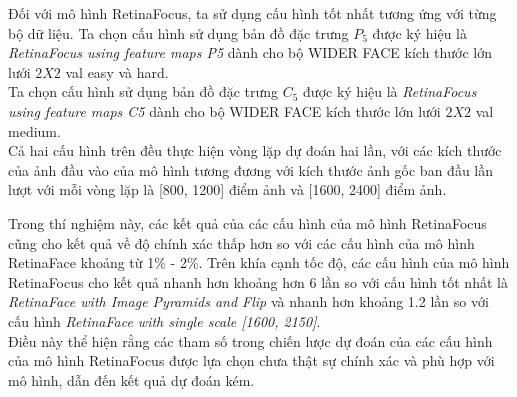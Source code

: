 {    \noindent
    Đối với mô hình RetinaFocus, ta sử dụng cấu hình tốt nhất tương ứng với từng bộ dữ liệu.
    Ta chọn cấu hình sử dụng bản đồ đặc trưng $P_5$ được ký hiệu là \textit{RetinaFocus using feature maps P5} dành cho bộ WIDER FACE kích thước lớn lưới $2 X 2$ val easy và hard. \\
    Ta chọn cấu hình sử dụng bản đồ đặc trưng $C_5$ được ký hiệu là \textit{RetinaFocus using feature maps C5} dành cho bộ WIDER FACE kích thước lớn lưới $2 X 2$ val medium. \\
    Cả hai cấu hình trên đều thực hiện vòng lặp dự đoán hai lần, với các kích thước của ảnh đầu vào của mô hình tương đương với kích thước ảnh gốc ban đầu lần lượt với mỗi vòng lặp là [800, 1200] điểm ảnh và [1600, 2400] điểm ảnh.

    \noindent
    Trong thí nghiệm này, các kết quả của các cấu hình của mô hình RetinaFocus cũng cho kết quả về độ chính xác thấp hơn so với các cấu hình của mô hình RetinaFace khoảng từ 1\% - 2\%.
    Trên khía cạnh tốc độ, các cấu hình của mô hình RetinaFocus cho kết quả nhanh hơn khoảng hơn 6 lần so với cấu hình tốt nhất là \textit{RetinaFace with Image Pyramids and Flip} và nhanh hơn khoảng 1.2 lần so với cấu hình \textit{RetinaFace with single scale [1600, 2150]}. \\
    Điều này thể hiện rằng các tham số trong chiến lược dự đoán của các cấu hình của mô hình RetinaFocus được lựa chọn chưa thật sự chính xác và phù hợp với mô hình, dẫn đến kết quả dự đoán kém.

}

